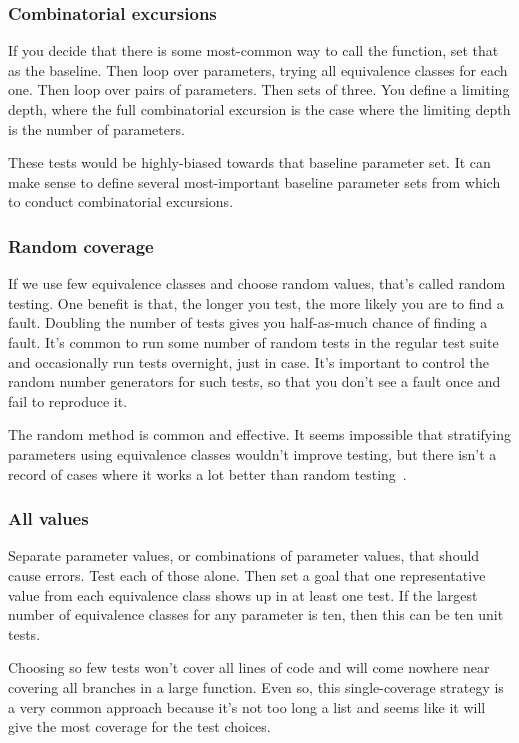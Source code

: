 \documentclass[fleqn,10pt]{olplainarticle}
\begin{document}
\subsubsection{Combinatorial excursions}
If you decide that there is some most-common way to call
the function, set that as the baseline. Then loop over parameters,
trying all equivalence classes for each one. Then loop over pairs of parameters. Then sets of three. You define a limiting depth,
where the full combinatorial excursion is the case where the
limiting depth is the number of parameters.

These tests would be highly-biased towards that baseline parameter set.
It can make sense to define several most-important baseline
parameter sets from which to conduct combinatorial excursions.


\subsubsection{Random coverage}

If we use few equivalence classes and choose
random values, that's called random testing. One benefit is
that, the longer you test, the more likely you are to find
a fault. Doubling the number of tests gives you half-as-much
chance of finding a fault. It's common to run some number
of random tests in the regular test suite and occasionally
run tests overnight, just in case. It's important to control
the random number generators for such tests, so that you don't
see a fault once and fail to reproduce it.

The random method is common and effective. It seems impossible
that stratifying parameters using equivalence classes wouldn't
improve testing, but there isn't a record of cases where
it works a lot better than random testing~\citep{arcuri2011random}.


\subsubsection{All values}

Separate parameter values, or combinations of parameter values,
that should cause errors. Test each of those alone.
Then set a goal that one representative value from each
equivalence class shows up in at least one test.
If the largest number of equivalence classes for any parameter
is ten, then this can be ten unit tests.

Choosing so few tests won't cover all lines of code
and will come nowhere near covering all branches in a
large function. Even so, this single-coverage strategy
is a very common approach because it's not too long a list
and seems like it will give the most coverage for the
test choices.
\end{document}
